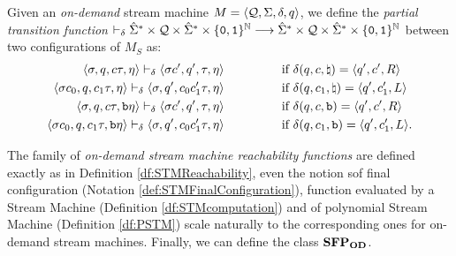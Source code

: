 \begin{defn}
  \label{def:smodtransfun}
Given an \emph{on-demand} stream machine $M=\langle \mathcal{Q},
\Sigma, \delta, q\rangle$,
we define the \emph{partial transition function}
$\vdash_{\delta} \hat{\Sigma}^* \times \mathcal{Q}
\times \hat{\Sigma}^* \times \{\mathtt{0},
\mathtt{1}\}^{\mathbb{N}} \longrightarrow \hat{\Sigma}^*
\times \mathcal{Q} \times \hat{\Sigma}^* \times \{\mathtt{0},
\mathtt{1}\}^{\mathbb{N}}$
between two configurations of $M_S$ as:
%
\begin{align*}
  \langle \sigma, q, c\tau, \eta\rangle
  \vdash_{\delta} \langle\sigma c', q', \tau, \eta\rangle
  \ \ \ \ \ \ \ \ \ \ \ \ \ &\text{ if }
  \delta (q,c,\natural)
  = \langle q',c',R\rangle
  \\
  \langle \sigma c_0, q, c_1\tau,\eta\rangle
  \vdash_{\delta} \langle \sigma, q', c_0c_1'\tau,
  \eta\rangle
   \ \ \ \ \ \ \ \ \ \ \ \ \ &\text{ if }
  \delta (q, c_1,\natural)
  = \langle q', c_1', L\rangle  \\
  \langle \sigma, q, c\tau, \mathtt{b} \eta\rangle
  \vdash_{\delta} \langle\sigma c', q', \tau, \eta\rangle
  \ \ \ \ \ \ \ \ \ \ \ \ \ &\text{ if }
  \delta (q,c,\mathtt{b})
  = \langle q',c',R\rangle
  \\
  \langle \sigma c_0, q, c_1\tau, \mathtt{b}
  \eta\rangle
  \vdash_{\delta} \langle \sigma, q', c_0c_1'\tau,
  \eta\rangle
   \ \ \ \ \ \ \ \ \ \ \ \ \ &\text{ if }
  \delta (q, c_1,\mathtt{b})
  = \langle q', c_1', L\rangle .
\end{align*}
\end{defn}
\noindent
The family of \emph{on-demand stream machine reachability functions} are defined
exactly as in Definition \ref{df:STMReachability}, even the notion sof
final configuration (Notation \ref{def:STMFinalConfiguration}),
function evaluated by a Stream Machine (Definition \ref{df:STMcomputation}) and of
polynomial Stream Machine (Definition \ref{df:PSTM}) scale naturally to
the corresponding ones for on-demand stream machines.
%
Finally, we can define the class $\mathbf{SFP_{\mathbf{OD}}}$.

